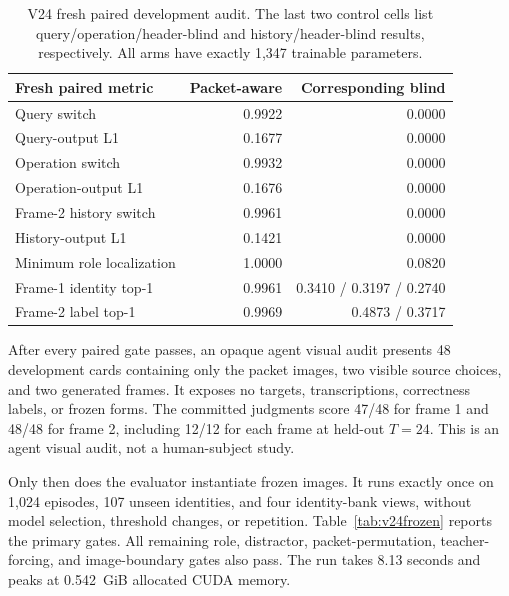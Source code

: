 \documentclass[11pt]{article}
\begin{document}
\begin{table}[t]
\centering
\small
\begin{tabular}{lrr}
\toprule
Fresh paired metric & Packet-aware & Corresponding blind \\
\midrule
Query switch & 0.9922 & 0.0000 \\
Query-output L1 & 0.1677 & 0.0000 \\
Operation switch & 0.9932 & 0.0000 \\
Operation-output L1 & 0.1676 & 0.0000 \\
Frame-2 history switch & 0.9961 & 0.0000 \\
History-output L1 & 0.1421 & 0.0000 \\
Minimum role localization & 1.0000 & 0.0820 \\
Frame-1 identity top-1 & 0.9961 & 0.3410 / 0.3197 / 0.2740 \\
Frame-2 label top-1 & 0.9969 & 0.4873 / 0.3717 \\
\bottomrule
\end{tabular}
\caption{V24 fresh paired development audit. The last two control cells list
query/operation/header-blind and history/header-blind results, respectively.
All arms have exactly 1,347 trainable parameters.}
\label{tab:v24paired}
\end{table}

After every paired gate passes, an opaque agent visual audit presents 48
development cards containing only the packet images, two visible source
choices, and two generated frames. It exposes no targets, transcriptions,
correctness labels, or frozen forms. The committed judgments score 47/48 for
frame 1 and 48/48 for frame 2, including 12/12 for each frame at held-out
$T=24$. This is an agent visual audit, not a human-subject study.

Only then does the evaluator instantiate frozen images. It runs exactly once
on 1,024 episodes, 107 unseen identities, and four identity-bank views, without
model selection, threshold changes, or repetition. Table~\ref{tab:v24frozen}
reports the primary gates. All remaining role, distractor, packet-permutation,
teacher-forcing, and image-boundary gates also pass. The run takes 8.13 seconds
and peaks at 0.542~GiB allocated CUDA memory.
\end{document}
